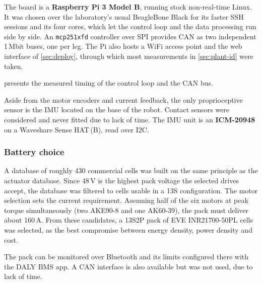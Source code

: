 \label{sec:compute-choice} The board is a \textbf{Raspberry Pi 3
Model B}, running stock non-real-time Linux. It was chosen over the laboratory's usual BeagleBone
Black for its faster SSH sessions and its four cores, which let the control loop and the data
processing run side by side.
An \texttt{mcp251xfd} controller over SPI provides CAN as two independent 1\,Mbit buses, one per leg.
The Pi also hosts a WiFi access point and the web interface of \cref{sec:deploy}, through which most measurements in \cref{sec:plant-id} were taken.

 presents the measured timing of the control loop and the CAN bus.

Aside from the motor encoders and current feedback, the only proprioceptive sensor is the IMU located on the base of the robot.
Contact sensors were considered and never fitted due to lack of time.
The IMU unit is an \textbf{ICM-20948} on a Waveshare Sense HAT\,(B), read over I2C. 


\subsubsection{Battery choice}
\label{sec:hw-battery}

A database of roughly 430 commercial cells was built on the same principle as the actuator database.
Since 48\,V is the highest pack voltage the selected drives accept, the database was filtered to cells usable in a 13S configuration.
The motor selection sets the current requirement. Assuming half of the six motors at peak torque simultaneously (two AKE90-8 and one AK60-39), the pack must deliver about 160\,A.
From these candidates, a 13S2P pack of EVE INR21700-50PL cells was selected, as the best compromise between energy density, power density and cost.

The pack can be monitored over Bluetooth and its limits configured there with the DALY BMS app.
A CAN interface is also available but was not used, due to lack of time.

